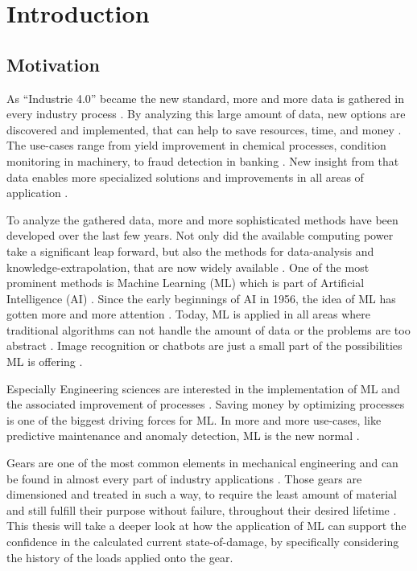 \chapter{Introduction}
\section{Motivation}\label{intro}
As “Industrie 4.0” became the new standard, more and more data is gathered in every industry process \cite{Vogel}. By analyzing this large amount of data, new options are discovered and implemented, that can help to save resources, time, and money \cite{Theodoridis}. The use-cases range from yield improvement in chemical processes, condition monitoring in machinery, to fraud detection in banking \cite{Janiesch}. New insight from that data enables more specialized solutions and improvements in all areas of application \cite{Russell}. 

To analyze the gathered data, more and more sophisticated methods have been developed over the last few years. Not only did the available computing power take a significant leap forward, but also the methods for data-analysis and knowledge-extrapolation, that are now widely available \cite{Janiesch}. One of the most prominent methods is Machine Learning (ML) which is part of Artificial Intelligence (AI) \cite{Helm}. Since the early beginnings of AI in 1956, the idea of ML has gotten more and more attention \cite{Russell}. Today, ML is applied in all areas where traditional algorithms can not handle the amount of data or the problems are too abstract \cite{Carleo}. Image recognition or chatbots are just a small part of the possibilities ML is offering \cite{Theodoridis}.

Especially Engineering sciences are interested in the implementation of ML and the associated improvement of processes \cite{Carleo}. Saving money by optimizing processes is one of the biggest driving forces for ML. In more and more use-cases, like predictive maintenance and anomaly detection, ML is the new normal \cite{Theodoridis}.

Gears are one of the most common elements in mechanical engineering and can be found in almost every part of industry applications \cite{Vullo}. Those gears are dimensioned and treated in such a way, to require the least amount of material and still fulfill their purpose without failure, throughout their desired lifetime \cite{Bugliarello}. This thesis will take a deeper look at how the application of ML can support the confidence in the calculated current state-of-damage, by specifically considering the history of the loads applied onto the gear. 
